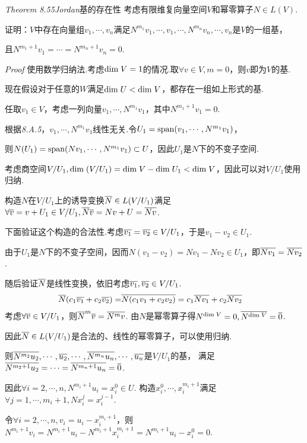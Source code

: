\textit{Theorem 8.55}\textit{Jordan}{\kaishu 基的存在性}
考虑有限维复向量空间\(V\)和幂零算子\(N \in L(V)\).

证明：\(V\)中存在向量组\(v_1,\cdots,v_n\)满足\(N^{m_1}v_1,\cdots,v_1,\cdots,N^{m_n}v_n,\cdots,v_n\)是\(V\)的一组基，

且\(N^{m_1+1}v_1=\cdots=N^{m_n+1}v_n=0\).

\textit{Proof}
使用数学归纳法.考虑\(\mathrm{dim \;} V=1\)的情况.取\(\forall v \in V,m=0\)，则\(v\)即为\(V\)的基.

现在假设对于任意的\(W\)满足\(\mathrm{dim \;} U<\mathrm{dim \;} V\)，都存在一组如上形式的基.

任取\(v_1 \in V\)，考虑一列向量\(v_1,\cdots,N^{m_1}v_1\)，其中\(N^{m_1+1}v_1=0\).

根据\textit{8.A.5}，\(v_1,\cdots,N^{m_1}v_1\)线性无关.令\(U_1=\mathrm{span} (v_1,\cdots,N^{m_1}v_1)\)，

则\(N(U_1)=\mathrm{span} (Nv_1,\cdots,N^{m_1}v_1) \subset U\)，因此\(U_1\)是\(N\)下的不变子空间.

考虑商空间\(V/U_1,\mathrm{dim \;} (V/U_1)=\mathrm{dim \;} V-\mathrm{dim \;} U_1<\mathrm{dim \;} V\)，因此可以对\(V/U_1\)使用归纳.

构造\(N\)在\(V/U_1\)上的诱导变换\(\overline{N} \in L(V/U_1)\)满足\(\forall \overline{v}=v+U_1 \in V/U_1,\overline{N}\overline{v}=Nv+U=\overline{Nv}\).

下面验证这个构造的合法性.考虑\(\overline{v_1}=\overline{v_2} \in V/U_1\)，于是\(v_1-v_2 \in U_1\).

由于\(U_1\)是\(N\)下的不变子空间，因而\(N(v_1-v_2)=Nv_1-Nv_2 \in U_1\)，即\(\overline{Nv_1}=\overline{Nv_2}\).

随后验证\(\overline{N}\)是线性变换，依旧考虑\(\overline{v_1},\overline{v_2} \in V/U_1\).
    \begin{align*}
        \overline{N}(c_1\overline{v_1}+c_2\overline{v_2})=&\overline{N(c_1v_1+c_2v_2)} =c_1\overline{Nv_1}+c_2\overline{Nv_2}
    \end{align*}
考虑\(\forall \overline{v} \in V/U_1\)，则\(\overline{N}^m \overline{v}=\overline{N^m v}\).
由\(N\)是幂零算子得\(N^{\mathrm{dim \;} V}=0,\overline{N^{\mathrm{dim \;} V}}=\overline{0}\).

因此\(\overline{N} \in L(V/U_1)\)是合法的、线性的幂零算子，可以使用归纳.

则\(\overline{N^{m_2}u_2},\cdots,\overline{u_2},\cdots,\overline{N^{m_n}u_n},\cdots,\overline{u_n}\)是\(V/U_1\)的基，
满足\(\overline{N^{m_2+1}u_2}=\cdots=\overline{N^{m_n+1}u_n}=\overline{0}\).

因此\(\forall i=2,\cdots,n,N^{m_i+1}u_i=x_i^0 \in U\).
构造\(x_i^0,\cdots,x_i^{m_i+1}\)满足\(\forall j=1,\cdots,m_i+1,Nx_i^j=x_i^{j-1}\).

令\(\forall i=2,\cdots,n,v_i=u_i-x_i^{m_i+1}\)，则\(N^{m_i+1}v_i=N^{m_i+1}u_i-N^{m_i+1}x_i^{m_i+1}=N^{m_i+1}u_i-x_i^0=0\).

